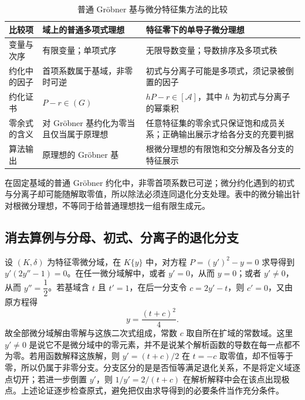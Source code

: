\begin{table}[htbp]
	\centering
	\caption{普通 Gröbner 基与微分特征集方法的比较}
	\label{b3:tab:E-groebner-characteristic-comparison}
	\begin{tabularx}{\textwidth}{@{}>{\raggedright\arraybackslash}p{}>{\raggedright\arraybackslash}X>{\raggedright\arraybackslash}X@{}}
		\toprule
		比较项 & 域上的普通多项式理想 & 特征零下的单导子微分理想 \\
		\midrule
		变量与次序 & 有限变量；单项式序 & 无限导数变量；导数排序及多项式秩 \\
		约化中的因子 & 首项系数属于基域，非零时可逆 & 初式与分离子可能是多项式，须记录被倒置的因子 \\
		约化证书 & \(P-r\in(G)\) & \(hP-r\in[\mathcal A]\)，其中 \(h\) 为初式与分离子的幂乘积 \\
		零余式的含义 & 对 Gröbner 基约化为零当且仅当属于原理想 & 任意特征集的零余式只保证饱和成员关系；正确输出展示才给各分支的充要判据 \\
		算法输出 & 原理想的 Gröbner 基 & 根微分理想的有限饱和交分解及各分支的特征展示 \\
		\bottomrule
	\end{tabularx}
\end{table}

在固定基域的普通 Gröbner 约化中，非零首项系数已可逆；微分约化遇到的初式与分离子却可能随解取零值，所以除法必须连同退化分支处理。表中的微分输出针对根微分理想，不等同于给普通理想找一组有限生成元。

\subsection{消去算例与分母、初式、分离子的退化分支}
\label{b3:subsec:E03:03}

\begin{example}[保留退化分支]\label{b3:exm:differential-singular-branch}
	设 \((K,\delta)\) 为特征零微分域，在 \(K\{y\}\) 中，对方程 \(P=(y')^2-y=0\) 求导得到 \(y'(2y''-1)=0\)。在任一微分域解中，或者 \(y'=0\)，从而 \(y=0\)；或者 \(y'\ne0\)，从而 \(y''=\dfrac12\)。若基域含 \(t\) 且 \(t'=1\)，在后一分支令 \(c=2y'-t\)，则 \(c'=0\)，又由原方程得
	\[
		y=\frac{(t+c)^2}{4}.
	\]
	故全部微分域解由零解与这族二次式组成，常数 \(c\) 取自所在扩域的常数域。这里 \(y'\ne0\) 是说它不是微分域中的零元素，并不是说某个解析函数的导数在每一点都不为零。若用函数解释这族解，则 \(y'=(t+c)/2\) 在 \(t=-c\) 取零值，却不恒等于零，所以仍属于非零分支。分支区分的是是否恒等满足退化关系，不是将定义域逐点切开；若进一步倒置 \(y'\)，则 \(1/y'=2/(t+c)\) 在解析解释中会在该点出现极点。上述论证逐步检查原式，避免把仅由求导得到的必要条件当作充分条件。
\end{example}

